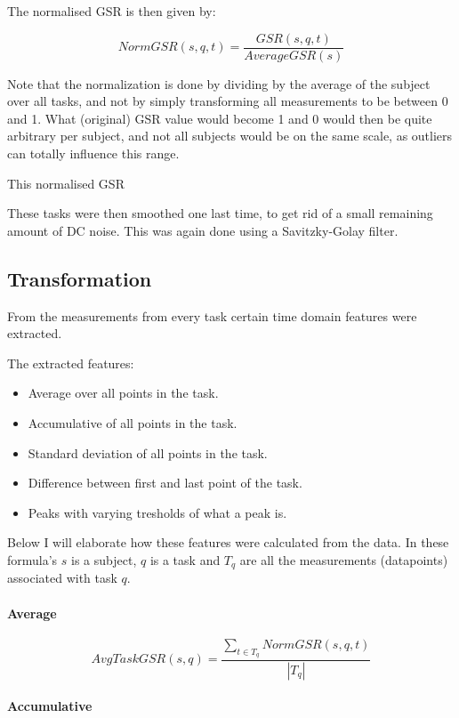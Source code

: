 \documentclass[12pt,leqno,letterpaper]{report} %
\begin{document}
The normalised GSR is then given by:

\[
NormGSR(s,q,t) = \frac{GSR(s,q,t)}{AverageGSR(s)}
\]

Note that the normalization is done by dividing by the average of the subject over all tasks, and not by simply transforming all measurements to be between 0 and 1. What (original) GSR value would become 1 and 0 would then be quite arbitrary per subject, and not all subjects would be on the same scale, as outliers can totally influence this range.

This normalised GSR 


These tasks were then smoothed one last time, to get rid of a small remaining amount of DC noise. This was again done using a Savitzky-Golay filter.

\subsection{Transformation}
From the measurements from every task certain time domain features were extracted. 

The extracted features:

\begin{itemize}

\item Average over all points in the task.
\item Accumulative of all points in the task.
\item Standard deviation of all points in the task.
\item Difference between first and last point of the task.
\item Peaks with varying tresholds of what a peak is.
\end{itemize}

Below I will elaborate how these features were calculated from the data. In these formula's $s$ is a subject, $q$ is a task and $T_q$ are all the measurements (datapoints) associated with task $q$.

\paragraph{Average}

\[
AvgTaskGSR(s,q) = \frac { \sum_{t \in T_q} NormGSR(s,q,t) }
{\left\vert{T_q}\right\vert }
\]

\paragraph{Accumulative}
\end{document}
